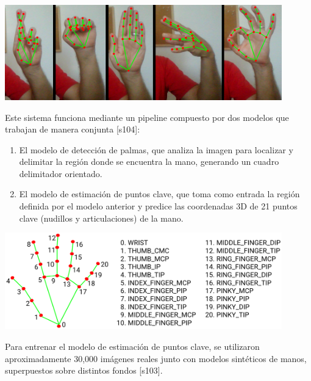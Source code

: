 \begin{center}
    \includegraphics[width=0.9\textwidth]{Images/Cap 2/MediaPipe_Hands.png}
\end{center}

Este sistema funciona mediante un pipeline compuesto por dos modelos que trabajan de manera conjunta [s104]:

\begin{enumerate}
    \item El modelo de detección de palmas, que analiza la imagen para localizar y delimitar la región donde se encuentra la mano, generando un cuadro delimitador orientado.
    \item El modelo de estimación de puntos clave, que toma como entrada la región definida por el modelo anterior y predice las coordenadas 3D de 21 puntos clave (nudillos y articulaciones) de la mano.
\end{enumerate}

\begin{center}
\includegraphics[width=0.9\textwidth]{Images/Cap 2/MediaPipe_hand_landmarks.png}
\end{center}


Para entrenar el modelo de estimación de puntos clave, se utilizaron aproximadamente 30,000 imágenes reales junto con modelos sintéticos de manos, superpuestos sobre distintos fondos [s103].\\

